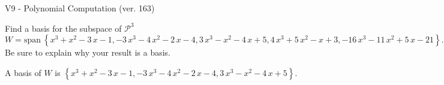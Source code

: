 \begin{exercise}
  \begin{exerciseTitle}V9 - Polynomial Computation (ver. 163)\end{exerciseTitle}
  \begin{exerciseStatement}
    Find a basis for the subspace of \(\mathcal{P}^3\) 
\[W=\mathrm{span}\ \left\{x^{3} + x^{2} - 3 \, x - 1 , -3 \, x^{3} - 4 \, x^{2} - 2 \, x - 4 , 3 \, x^{3} - x^{2} - 4 \, x + 5 , 4 \, x^{3} + 5 \, x^{2} - x + 3 , -16 \, x^{3} - 11 \, x^{2} + 5 \, x - 21\right\}.\]
 Be sure to explain why your result is a basis.


  \end{exerciseStatement}
  \begin{exerciseAnswer}
   A basis of \(W\) is  \(\left\{x^{3} + x^{2} - 3 \, x - 1 , -3 \, x^{3} - 4 \, x^{2} - 2 \, x - 4 , 3 \, x^{3} - x^{2} - 4 \, x + 5\right\}\).
  


  \end{exerciseAnswer}
\end{exercise}